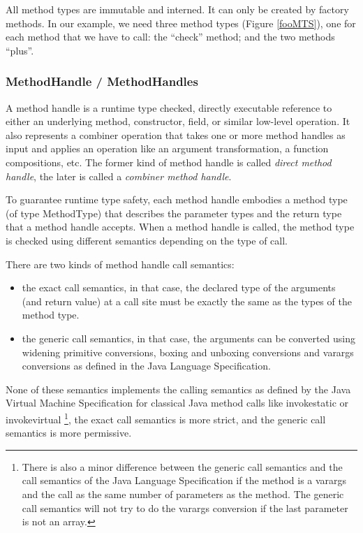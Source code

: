 \documentclass{sig-alternate}
\begin{document}
      All method types are immutable and interned.
      It can only be created by factory methods.
      In our example, we need three method types (Figure \ref{fooMTS}), one for each method that we have to call:
      the ``check'' method; and the two methods ``plus''.

    \subsubsection{MethodHandle / MethodHandles}
      \label{MH}

      A method handle is a runtime type checked, directly executable reference to
      either an underlying method, constructor, field, or similar low-level operation.
      It also represents a combiner operation that takes one or more method handles as input and
      applies an operation like an argument transformation, a function compositions, etc.
      The former kind of method handle is called {\it direct method handle},
      the later is called a {\it combiner method handle}.

      To guarantee runtime type safety, each method handle embodies a method type (of type MethodType)
      that describes the parameter types and the return type that a method handle accepts.
      When a method handle is called, the method type is checked using different semantics depending on the
      type of call.

      There are two kinds of method handle call semantics:
      \begin{itemize}
        \item the exact call semantics, in that case, the declared type of the arguments (and return value) at a call site
              must be exactly the same as the types of the method type.
        \item the generic call semantics, in that case, the arguments can be converted using widening primitive conversions,
              boxing and unboxing conversions and varargs conversions as defined in the Java Language Specification.
      \end{itemize}
      None of these semantics implements the calling semantics as defined by the Java Virtual Machine Specification
      for classical Java method calls like invokestatic or invokevirtual
      \footnote{There is also a minor difference between the generic call semantics and the call semantics of
        the Java Language Specification if the method is a varargs and the call as the same number of parameters as the method.
        The generic call semantics will not try to do the varargs conversion if the last parameter is not an array.},
      the exact call semantics is more strict, and the generic call semantics is more permissive.
\end{document}
